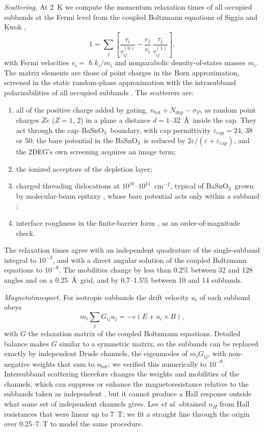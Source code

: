 \documentclass[11pt]{article}
\newcommand{\BSO}{\texorpdfstring{BaSnO$_3$}{BaSnO3}}
\newcommand{\ntot}{n_\mathrm{tot}}
\begin{document}
\emph{Scattering.} At 2~K we compute the momentum relaxation times of all occupied subbands at the Fermi level from the coupled Boltzmann equations of Siggia and Kwok \cite{SiggiaKwok1970},
\begin{equation}
1=\sum_j\left[\frac{\tau_i}{\tau^{(0)}_{ij}}-\frac{v_j}{v_i}\,\frac{\tau_j}{\tau^{(1)}_{ij}}\right],
\end{equation}
with Fermi velocities $v_i=\hslash k_i/m_i$ and nonparabolic density-of-states masses $m_i$. The matrix elements are those of point charges in the Born approximation, screened in the static random-phase approximation with the intrasubband polarizabilities of all occupied subbands \cite{SiggiaKwok1970,AFS1982}. The scatterers are:
\begin{enumerate}
\item all of the positive charge added by gating, $\ntot+N_\mathrm{dep}-\sigma_P$, as random point charges $Ze$ ($Z=1$, 2) in a plane a distance $d=1$--32~\AA\ inside the cap. They act through the cap--\BSO\ boundary, with cap permittivity $\varepsilon_\mathrm{cap}=24$, 38 or 50: the bare potential in the \BSO\ is reduced by $2\varepsilon/(\varepsilon+\varepsilon_\mathrm{cap})$, and the 2DEG's own screening acquires an image term;
\item the ionized acceptors of the depletion layer;
\item charged threading dislocations at $10^{10}$--$10^{11}$~cm$^{-2}$, typical of \BSO\ grown by molecular-beam epitaxy \cite{Paik2017}, whose bare potential acts only within a subband \cite{Jena2000};
\item interface roughness in the finite-barrier form \cite{AFS1982}, as an order-of-magnitude check.
\end{enumerate}
The relaxation times agree with an independent quadrature of the single-subband integral to $10^{-3}$, and with a direct angular solution of the coupled Boltzmann equations to $10^{-9}$. The mobilities change by less than 0.2\% between 32 and 128 angles and on a 0.25~\AA\ grid, and by 0.7--1.5\% between 10 and 14 subbands.

\emph{Magnetotransport.} For isotropic subbands the drift velocity $u_i$ of each subband obeys
\begin{equation}
m_i\sum_jG_{ij}u_j=-e(E+u_i\times B),
\end{equation}
with $G$ the relaxation matrix of the coupled Boltzmann equations. Detailed balance makes $G$ similar to a symmetric matrix, so the subbands can be replaced exactly by independent Drude channels, the eigenmodes of $m_iG_{ij}$, with non-negative weights that sum to $\ntot$; we verified this numerically to $10^{-9}$. Intersubband scattering therefore changes the weights and mobilities of the channels, which can suppress or enhance the magnetoresistance relative to the subbands taken as independent \cite{Zaremba1992}, but it cannot produce a Hall response outside what some set of independent channels gives. Lee \emph{et al.} obtained $n_H$ from Hall resistances that were linear up to 7~T; we fit a straight line through the origin over 0.25--7~T to model the same procedure.
\end{document}
